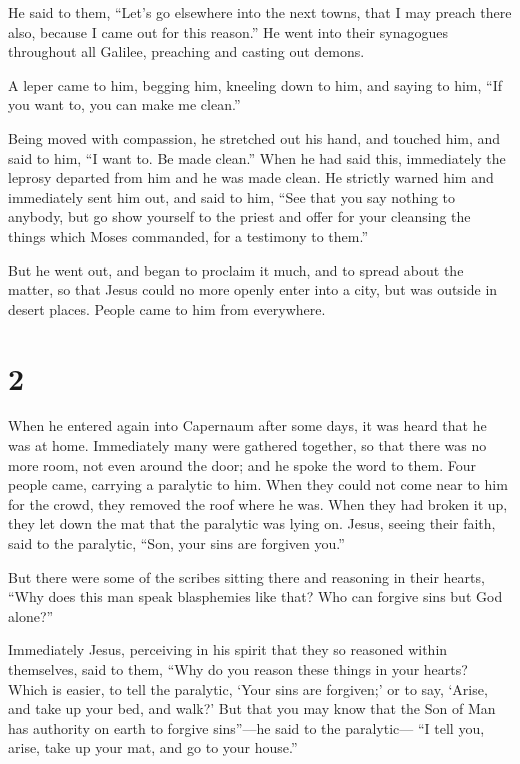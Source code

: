  He said to them, ``Let's go elsewhere into the next towns,
that I may preach there also, because I came out for this reason.''
 He went into their synagogues throughout all Galilee,
preaching and casting out demons.

 A leper came to him, begging him, kneeling down to him,
and saying to him, ``If you want to, you can make me clean.''

 Being moved with compassion, he stretched out his hand,
and touched him, and said to him, ``I want to. Be made clean.''
 When he had said this, immediately the leprosy departed
from him and he was made clean.  He strictly warned him and
immediately sent him out,  and said to him, ``See that you
say nothing to anybody, but go show yourself to the priest and offer for
your cleansing the things which Moses commanded, for a testimony to
them.''

 But he went out, and began to proclaim it much, and to
spread about the matter, so that Jesus could no more openly enter into a
city, but was outside in desert places. People came to him from
everywhere.

\hypertarget{section-1}{%
\section{2}\label{section-1}}

 When he entered again into Capernaum after some days, it
was heard that he was at home.  Immediately many were
gathered together, so that there was no more room, not even around the
door; and he spoke the word to them.  Four people came,
carrying a paralytic to him.  When they could not come near
to him for the crowd, they removed the roof where he was. When they had
broken it up, they let down the mat that the paralytic was lying on.
 Jesus, seeing their faith, said to the paralytic, ``Son,
your sins are forgiven you.''

 But there were some of the scribes sitting there and
reasoning in their hearts,  ``Why does this man speak
blasphemies like that? Who can forgive sins but God alone?''

 Immediately Jesus, perceiving in his spirit that they so
reasoned within themselves, said to them, ``Why do you reason these
things in your hearts?  Which is easier, to tell the
paralytic, `Your sins are forgiven;' or to say, `Arise, and take up your
bed, and walk?'  But that you may know that the Son of Man
has authority on earth to forgive sins''---he said to the paralytic---
 ``I tell you, arise, take up your mat, and go to your
house.''

